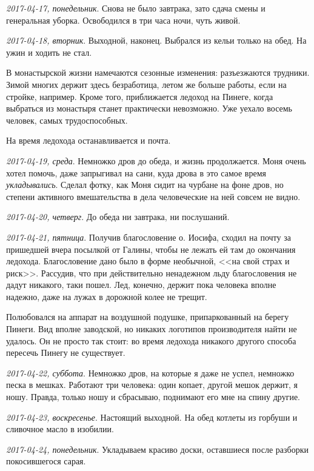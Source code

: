 \documentclass[
    12pt
    ,a4paper
    ,oneside
    ,russian
]{memoir}
\newcommand{\mydatestamp}{
    \bigskip   %
    \emph
}
\newcommand{\mds}{\mydatestamp}
\begin{document}
    \mds{2017-04-17, понедельник}. Снова не было завтрака, зато сдача смены и генеральная уборка. Освободился в три часа ночи, чуть живой.
    
    \mds{2017-04-18, вторник}. Выходной, наконец. Выбрался из кельи только на обед. На ужин и ходить не стал.
    
    В монастырской жизни намечаются сезонные изменения: разъезжаются трудники. Зимой многих держит здесь безработица, летом же больше работы, если на стройке, например. Кроме того, приближается ледоход на Пинеге, когда выбраться из монастыря станет практически невозможно. Уже уехало восемь человек, самых трудоспособных.
    
    На время ледохода останавливается и почта.
    
    \mds{2017-04-19, среда}. Немножко дров до обеда, и жизнь продолжается. Моня очень хотел помочь, даже запрыгивал на сани, куда дрова в это самое время \emph{укладывались}. Сделал фотку, как Моня сидит на чурбане на фоне дров, но степени активного вмешательства в дела человеческие на ней совсем не видно.
    
    \mds{2017-04-20, четверг}. До обеда ни завтрака, ни послушаний.
    
    \mds{2017-04-21, пятница}. Получив благословение о. Иосифа, сходил на почту за пришедшей вчера посылкой от Галины, чтобы не лежать ей там до окончания ледохода. Благословение дано было в форме необычной, <<на свой страх и риск>>. Рассудив, что при действительно ненадежном льду благословения не дадут никакого, таки пошел. Лед, конечно, держит пока человека вполне надежно, даже на лужах в дорожной колее не трещит. 
    
    Полюбовался на аппарат на воздушной подушке, припаркованный на берегу Пинеги. Вид вполне заводской, но никаких логотипов производителя найти не удалось. Он не просто так стоит: во время ледохода никакого другого способа пересечь Пинегу не существует. 
    
    \mds{2017-04-22, суббота}. Немножко дров, на которые я даже не успел, немножко песка в мешках. Работают три человека: один копает, другой мешок держит, я ношу. Правда, только ношу и сбрасываю, поднимают его мне на спину другие.
    
    \mds{2017-04-23, воскресенье}. Настоящий выходной. На обед котлеты из горбуши и сливочное масло в изобилии.

    \mds{2017-04-24, понедельник}. Укладываем красиво доски, оставшиеся после разборки покосившегося сарая.
    
\end{document}
